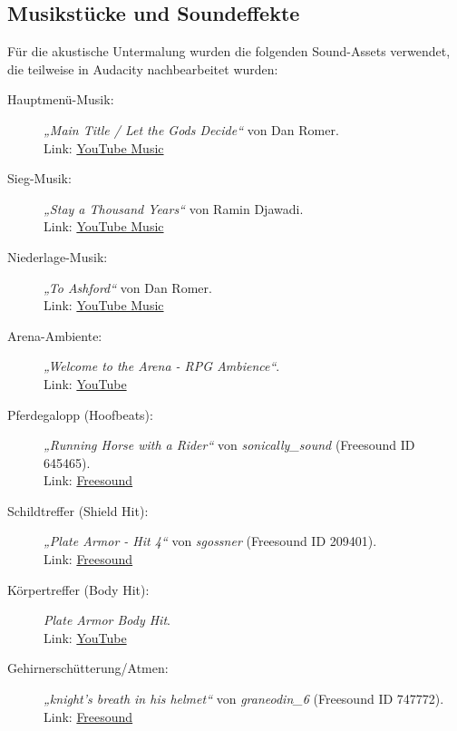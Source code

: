 \documentclass[11pt, a4paper]{article}
\begin{document}
\subsection{Musikstücke und Soundeffekte}
Für die akustische Untermalung wurden die folgenden Sound-Assets verwendet, die teilweise in Audacity nachbearbeitet wurden:

\begin{description}
    \item[Hauptmenü-Musik:] \textit{„Main Title / Let the Gods Decide“} von Dan Romer. \\
    Link: \href{https://music.youtube.com/watch?v=AfjQ9JGxHNg}{YouTube Music}
    
    \item[Sieg-Musik:] \textit{„Stay a Thousand Years“} von Ramin Djawadi. \\
    Link: \href{https://music.youtube.com/watch?v=MP7zZ_ZFUBo}{YouTube Music}
    
    \item[Niederlage-Musik:] \textit{„To Ashford“} von Dan Romer. \\
    Link: \href{https://music.youtube.com/watch?v=a1HiKCwwTzo}{YouTube Music}
    
    \item[Arena-Ambiente:] \textit{„Welcome to the Arena - RPG Ambience“}. \\
    Link: \href{https://www.youtube.com/watch?v=pUypls1WgCg}{YouTube}
    
    \item[Pferdegalopp (Hoofbeats):] \textit{„Running Horse with a Rider“} von \textit{sonically\_sound} (Freesound ID 645465). \\
    Link: \href{https://freesound.org/people/sonically_sound/sounds/645465/}{Freesound}
    
    \item[Schildtreffer (Shield Hit):] \textit{„Plate Armor - Hit 4“} von \textit{sgossner} (Freesound ID 209401). \\
    Link: \href{https://freesound.org/people/sgossner/sounds/209401/}{Freesound}
    
    \item[Körpertreffer (Body Hit):] \textit{Plate Armor Body Hit}. \\
    Link: \href{https://www.youtube.com/watch?v=srkI6Y6xgeU}{YouTube}
    
    \item[Gehirnerschütterung/Atmen:] \textit{„knight's breath in his helmet“} von \textit{graneodin\_6} (Freesound ID 747772). \\
    Link: \href{https://freesound.org/people/graneodin_6/sounds/747772/}{Freesound}
\end{description}
\end{document}
